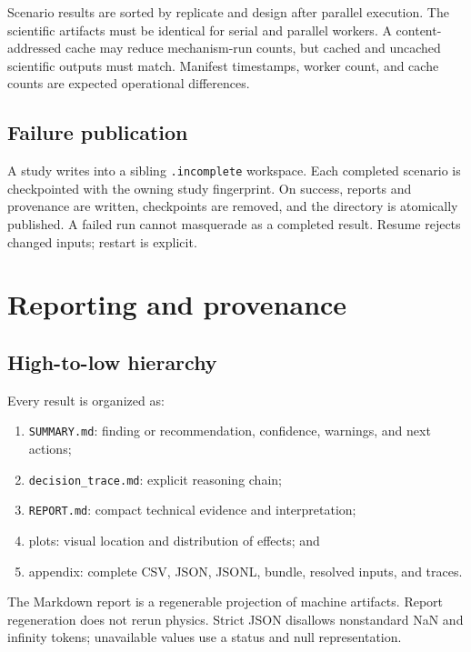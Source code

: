 \documentclass[11pt,oneside]{report}
\newcommand{\code}[1]{\texttt{#1}}
\begin{document}
Scenario results are sorted by replicate and design after parallel execution.  The
scientific artifacts must be identical for serial and parallel workers.  A
content-addressed cache may reduce mechanism-run counts, but cached and uncached
scientific outputs must match.  Manifest timestamps, worker count, and cache counts are
expected operational differences.

\section{Failure publication}

A study writes into a sibling \code{.incomplete} workspace.  Each completed scenario is
checkpointed with the owning study fingerprint.  On success, reports and provenance are
written, checkpoints are removed, and the directory is atomically published.  A failed
run cannot masquerade as a completed result.  Resume rejects changed inputs; restart is
explicit.

\chapter{Reporting and provenance}\label{ch:reporting}

\section{High-to-low hierarchy}

Every result is organized as:

\begin{enumerate}
  \item \code{SUMMARY.md}: finding or recommendation, confidence, warnings, and next
        actions;
  \item \code{decision\_trace.md}: explicit reasoning chain;
  \item \code{REPORT.md}: compact technical evidence and interpretation;
  \item plots: visual location and distribution of effects; and
  \item appendix: complete CSV, JSON, JSONL, bundle, resolved inputs, and traces.
\end{enumerate}

The Markdown report is a regenerable projection of machine artifacts.  Report
regeneration does not rerun physics.  Strict JSON disallows nonstandard NaN and infinity
tokens; unavailable values use a status and null representation.
\end{document}
